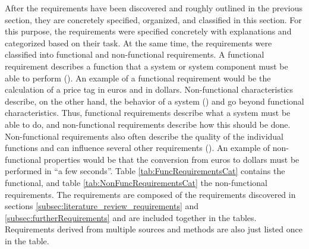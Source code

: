 After the requirements have been discovered and roughly outlined in the previous section, they are concretely specified, organized, and classified in this section. For this purpose, the requirements were specified concretely with explanations and categorized based on their task. At the same time, the requirements were classified into functional and non-functional requirements. A functional requirement describes a function that a system or system component must be able to perform (\cite{IEEE.1990}). An example of a functional requirement would be the calculation of a price tag in euros and in dollars. Non-functional characteristics describe, on the other hand, the behavior of a system (\cite{Seacord.2003}) and go beyond functional characteristics. Thus, functional requirements describe what a system must be able to do, and non-functional requirements describe how this should be done. Non-functional requirements also often describe the quality of the individual functions and can influence several other requirements (\cite{Balzert.2011}). An example of non-functional properties would be that the conversion from euros to dollars must be performed in \enquote{a few seconds}. Table \ref{tab:FuncRequirementsCat} contains the functional, and table \ref{tab:NonFuncRequirementsCat} the non-functional requirements. The requirements are composed of the requirements discovered in sections \ref{subsec:literature_review_requirements} and \ref{subsec:furtherRequirements} and are included together in the tables. Requirements derived from multiple sources and methods are also just listed once in the table.



